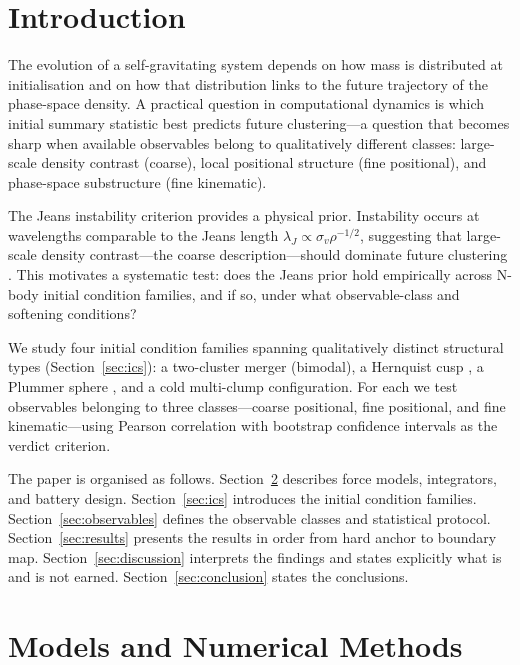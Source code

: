 \documentclass[11pt,a4paper]{article}
\begin{document}
\section{Introduction}
\label{sec:intro}

The evolution of a self-gravitating system depends on how mass is distributed
at initialisation and on how that distribution links to the future trajectory
of the phase-space density.
A practical question in computational dynamics is which initial summary
statistic best predicts future clustering---a question that becomes sharp
when available observables belong to qualitatively different classes:
large-scale density contrast (coarse), local positional structure
(fine positional), and phase-space substructure (fine kinematic).

The Jeans instability criterion provides a physical prior.
Instability occurs at wavelengths comparable to the Jeans length
$\lambda_J \propto \sigma_v \rho^{-1/2}$, suggesting that large-scale
density contrast---the coarse description---should dominate future clustering
\citep{BinneyTremaine2008}.
This motivates a systematic test: does the Jeans prior hold empirically
across N-body initial condition families, and if so, under what
observable-class and softening conditions?

We study four initial condition families spanning qualitatively distinct
structural types (Section~\ref{sec:ics}): a two-cluster merger (bimodal),
a Hernquist cusp \citep{Hernquist1990}, a Plummer sphere \citep{Plummer1911},
and a cold multi-clump configuration.
For each we test observables belonging to three classes---coarse positional,
fine positional, and fine kinematic---using Pearson correlation with bootstrap
confidence intervals as the verdict criterion.

The paper is organised as follows.
Section~\ref{sec:methods} describes force models, integrators, and battery
design.
Section~\ref{sec:ics} introduces the initial condition families.
Section~\ref{sec:observables} defines the observable classes and statistical
protocol.
Section~\ref{sec:results} presents the results in order from hard anchor to
boundary map.
Section~\ref{sec:discussion} interprets the findings and states explicitly
what is and is not earned.
Section~\ref{sec:conclusion} states the conclusions.


\section{Models and Numerical Methods}
\label{sec:methods}
\end{document}

